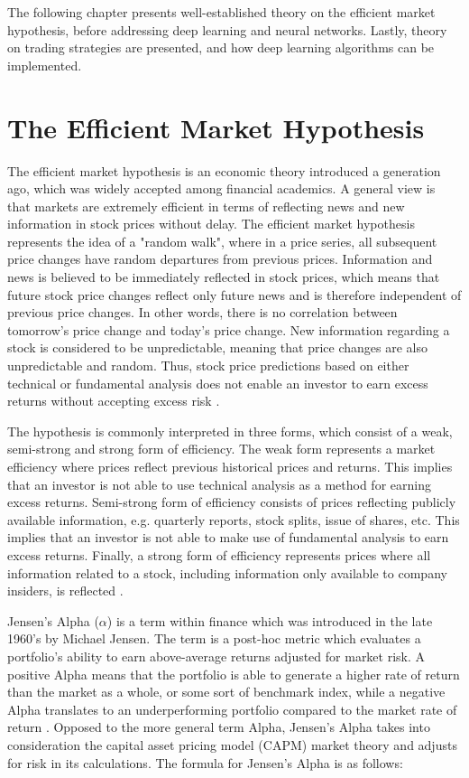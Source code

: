 The following chapter presents well-established theory on the efficient market hypothesis, before addressing deep learning and neural networks. Lastly, theory on trading strategies are presented, and how deep learning algorithms can be implemented.

\section{The Efficient Market Hypothesis}
The efficient market hypothesis is an economic theory introduced a generation ago, which was widely accepted among financial academics. A general view is that markets are extremely efficient in terms of reflecting news and new information in stock prices without delay. The efficient market hypothesis represents the idea of a "random walk", where in a price series, all subsequent price changes have random departures from previous prices. Information and news is believed to be immediately reflected in stock prices, which means that future stock price changes reflect only future news and is therefore independent of previous price changes. In other words, there is no correlation between tomorrow's price change and today's price change. New information regarding a stock is considered to be unpredictable, meaning that price changes are also unpredictable and random. Thus, stock price predictions based on either technical or fundamental analysis does not enable an investor to earn excess returns without accepting excess risk \cite{malkiel}. 

\indent \newline 
The hypothesis is commonly interpreted in three forms, which consist of a weak, semi-strong and strong form of efficiency. The weak form represents a market efficiency where prices reflect previous historical prices and returns. This implies that an investor is not able to use technical analysis as a method for earning excess returns. Semi-strong form of efficiency consists of prices reflecting publicly available information, e.g. quarterly reports, stock splits, issue of shares, etc. This implies that an investor is not able to make use of fundamental analysis to earn excess returns. Finally, a strong form of efficiency represents prices where all information related to a stock, including information only available to company insiders, is reflected \cite{fama}. 

\indent \newline 
Jensen's Alpha ($\alpha$) is a term within finance which was introduced in the late 1960's by Michael Jensen. The term is a post-hoc metric which evaluates a portfolio's ability to earn above-average returns adjusted for market risk. A positive Alpha means that the portfolio is able to generate a higher rate of return than the market as a whole, or some sort of benchmark index, while a negative Alpha translates to an underperforming portfolio compared to the market rate of return \cite{inproceedings}. Opposed to the more general term Alpha, Jensen's Alpha takes into consideration the capital asset pricing model (CAPM) market theory and adjusts for risk in its calculations. The formula for Jensen's Alpha is as follows:

